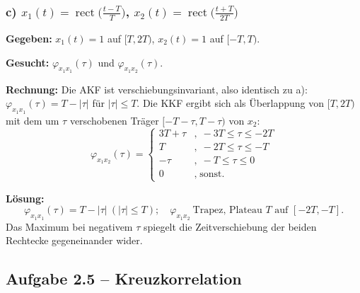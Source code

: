 \subsubsection*{c) $x_1(t)=\operatorname{rect}\!\big(\tfrac{t-T}{T}\big)$, $x_2(t)=\operatorname{rect}\!\big(\tfrac{t+T}{2T}\big)$}

\begin{beispiel}

\textbf{Gegeben:} $x_1(t)=1$ auf $[T,2T)$, $x_2(t)=1$ auf $[-T,T)$.

\textbf{Gesucht:} $\varphi_{x_1 x_1}(\tau)$ und $\varphi_{x_1 x_2}(\tau)$.

\textbf{Rechnung:} Die AKF ist verschiebungsinvariant, also identisch zu a):
$\varphi_{x_1 x_1}(\tau)=T-|\tau|$ für $|\tau|\leq T$. Die KKF ergibt sich als
Überlappung von $[T,2T)$ mit dem um $\tau$ verschobenen Träger $[-T-\tau, T-\tau)$
von $x_2$:
$$
\varphi_{x_1 x_2}(\tau) = \begin{cases}
3T+\tau & , \; -3T\leq \tau \leq -2T \\
T & , \; -2T\leq \tau \leq -T \\
-\tau & , \; -T\leq \tau \leq 0 \\
0 & , \; \text{sonst.}
\end{cases}
$$

\textbf{Lösung:}
$$
\boxed{\;\varphi_{x_1 x_1}(\tau)=T-|\tau|\ (|\tau|\leq T);\quad
\varphi_{x_1 x_2}\ \text{Trapez, Plateau } T \text{ auf } [-2T,-T].\;}
$$
Das Maximum bei negativem $\tau$ spiegelt die Zeitverschiebung der beiden
Rechtecke gegeneinander wider.
\end{beispiel}

\subsection*{Aufgabe 2.5 – Kreuzkorrelation}

